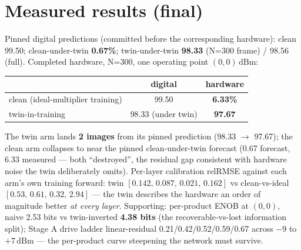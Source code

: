\documentclass[11pt]{article}
\newcommand{\dbm}{\ensuremath{\,\mathrm{dBm}}}
\begin{document}
\section{Measured results (final)}
Pinned digital predictions (committed before the corresponding
hardware): clean 99.50; clean-under-twin \textbf{0.67\%};
twin-under-twin \textbf{98.33} (N=300 frame) / 98.56 (full).
Completed hardware, N=300, one operating point $(0,0)$\dbm:
\begin{center}
\begin{tabular}{lcc}
\toprule
 & digital & hardware\\
\midrule
clean (ideal-multiplier training) & 99.50 & \textbf{6.33\%}\\
twin-in-training & 98.33 (under twin) & \textbf{97.67}\\
\bottomrule
\end{tabular}
\end{center}
The twin arm lands \textbf{2 images} from its pinned prediction
(98.33 $\to$ 97.67); the clean arm collapses to near the pinned
clean-under-twin forecast (0.67 forecast, 6.33 measured --- both
``destroyed'', the residual gap consistent with hardware noise the
twin deliberately omits). Per-layer calibration relRMSE against each
arm's own training forward: twin
$[0.142,\,0.087,\,0.021,\,0.162]$ vs clean-vs-ideal
$[0.53,\,0.61,\,0.32,\,2.94]$ --- the twin describes the hardware
an order of magnitude better \emph{at every layer}. Supporting:
per-product ENOB at $(0,0)$, naive 2.53 bits vs twin-inverted
\textbf{4.38 bits} (the recoverable-vs-lost information split);
Stage A drive ladder linear-residual 0.21/0.42/0.52/0.59/0.67
across $-9$ to $+7$\dbm{} --- the per-product curve steepening the
network must survive.
\end{document}
